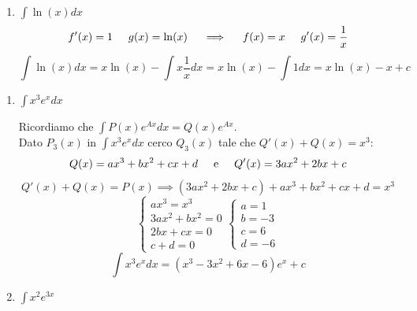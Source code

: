 \begin{exercise}
\begin{enumerate}
        \item $\int \ln(x)dx$
        \begin{equation*}f'(x)=1\hspace{.5cm}g(x)=\ln(x)\hspace{.5cm}\Longrightarrow\hspace{.5cm}f(x)=x\hspace{.5cm}g'(x)=\frac{1}{x}\end{equation*}
        \begin{equation*}\int\ln(x)dx = x\ln(x)-\int x\frac{1}{x}dx = x\ln(x)-\int 1dx = x\ln(x)-x+c \end{equation*}
    \end{enumerate}
\end{exercise}


\begin{exercise}\phantom{}
\begin{enumerate}
    \item $\int x^3e^xdx$
    
    Ricordiamo che $\int P(x)e^{Ax}dx=Q(x)e^{Ax}$.\\
    Dato $P_3(x)$ in $\int x^3e^xdx$ cerco $Q_3(x)$ tale che $Q'(x)+Q(x)=x^3$:
    \begin{equation*}Q(x)=ax^3+bx^2+cx+d\hspace{.5cm}\text{e}\hspace{.5cm}Q'(x)=3ax^2+2bx+c\end{equation*}
    \begin{equation*}Q'(x)+Q(x)=P(x) \implies (3ax^2+2bx+c)+ax^3+bx^2+cx+d=x^3\end{equation*}
    $$\begin{cases}ax^3=x^3\\3ax^2+bx^2=0\\2bx+cx=0\\c+d=0\end{cases}\begin{cases}a=1\\b=-3\\c=6\\d=-6\end{cases}$$
    \begin{equation*}\int x^3e^xdx=(x^3-3x^2+6x-6)e^x+c\end{equation*}
    
    \item $\int x^2e^{3x}$
    

\end{enumerate}
\end{exercise}
